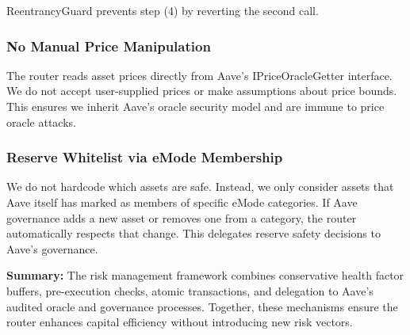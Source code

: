 ReentrancyGuard prevents step (4) by reverting the second call.

\subsubsection{No Manual Price Manipulation}

The router reads asset prices directly from Aave's IPriceOracleGetter interface. We do not accept user-supplied prices or make assumptions about price bounds. This ensures we inherit Aave's oracle security model and are immune to price oracle attacks.

\subsubsection{Reserve Whitelist via eMode Membership}

We do not hardcode which assets are safe. Instead, we only consider assets that Aave itself has marked as members of specific eMode categories. If Aave governance adds a new asset or removes one from a category, the router automatically respects that change. This delegates reserve safety decisions to Aave's governance.

\textbf{Summary:} The risk management framework combines conservative health factor buffers, pre-execution checks, atomic transactions, and delegation to Aave's audited oracle and governance processes. Together, these mechanisms ensure the router enhances capital efficiency without introducing new risk vectors.